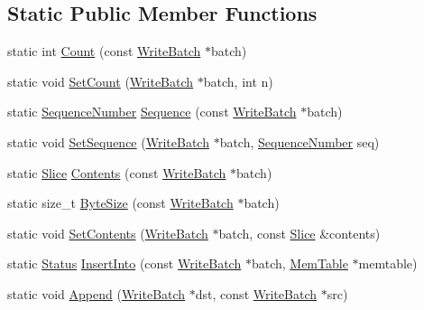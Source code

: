 \subsection*{Static Public Member Functions}
\begin{DoxyCompactItemize}
\item 
static int \hyperlink{classleveldb_1_1_write_batch_internal_a5270ca4567dbae1524005ad14e0698e3}{Count} (const \hyperlink{classleveldb_1_1_write_batch}{Write\+Batch} $\ast$batch)
\item 
static void \hyperlink{classleveldb_1_1_write_batch_internal_ae03d20619da53aae175dd28d61c90bd9}{Set\+Count} (\hyperlink{classleveldb_1_1_write_batch}{Write\+Batch} $\ast$batch, int n)
\item 
static \hyperlink{namespaceleveldb_a5481ededd221c36d652c371249f869fa}{Sequence\+Number} \hyperlink{classleveldb_1_1_write_batch_internal_af657c82bd9378b78c35a3a7429f945d4}{Sequence} (const \hyperlink{classleveldb_1_1_write_batch}{Write\+Batch} $\ast$batch)
\item 
static void \hyperlink{classleveldb_1_1_write_batch_internal_a0ca3483de37433fb0ce37b1e91f01bd1}{Set\+Sequence} (\hyperlink{classleveldb_1_1_write_batch}{Write\+Batch} $\ast$batch, \hyperlink{namespaceleveldb_a5481ededd221c36d652c371249f869fa}{Sequence\+Number} seq)
\item 
static \hyperlink{classleveldb_1_1_slice}{Slice} \hyperlink{classleveldb_1_1_write_batch_internal_a348947b16653c8a17590b13115b5274d}{Contents} (const \hyperlink{classleveldb_1_1_write_batch}{Write\+Batch} $\ast$batch)
\item 
static size\+\_\+t \hyperlink{classleveldb_1_1_write_batch_internal_adad424f13cc3e3ed4a2eacb88eaa39df}{Byte\+Size} (const \hyperlink{classleveldb_1_1_write_batch}{Write\+Batch} $\ast$batch)
\item 
static void \hyperlink{classleveldb_1_1_write_batch_internal_aa07e75250aed00d06f2e4df85ee926b9}{Set\+Contents} (\hyperlink{classleveldb_1_1_write_batch}{Write\+Batch} $\ast$batch, const \hyperlink{classleveldb_1_1_slice}{Slice} \&contents)
\item 
static \hyperlink{classleveldb_1_1_status}{Status} \hyperlink{classleveldb_1_1_write_batch_internal_a102aae14259fd277e2576338ce3e5551}{Insert\+Into} (const \hyperlink{classleveldb_1_1_write_batch}{Write\+Batch} $\ast$batch, \hyperlink{classleveldb_1_1_mem_table}{Mem\+Table} $\ast$memtable)
\item 
static void \hyperlink{classleveldb_1_1_write_batch_internal_ac83c9a45a815c16ad8602b99b752b4bc}{Append} (\hyperlink{classleveldb_1_1_write_batch}{Write\+Batch} $\ast$dst, const \hyperlink{classleveldb_1_1_write_batch}{Write\+Batch} $\ast$src)
\end{DoxyCompactItemize}


